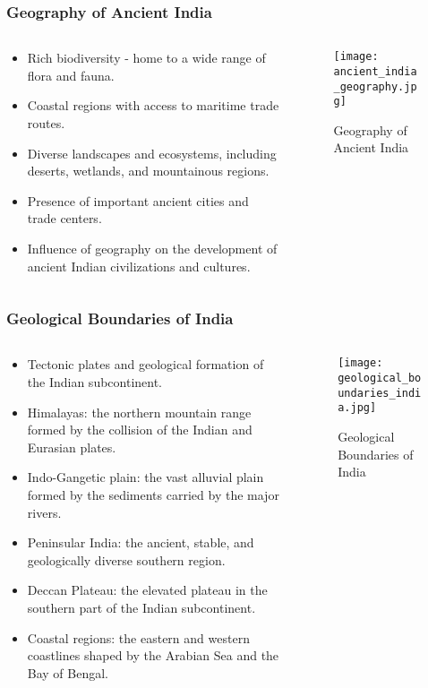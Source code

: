 \begin{frame}[fragile]\frametitle{Geography of Ancient India}
\begin{columns}
\begin{column}{0.5\textwidth}
\begin{itemize}
   \item Rich biodiversity - home to a wide range of flora and fauna.
   \item Coastal regions with access to maritime trade routes.
   \item Diverse landscapes and ecosystems, including deserts, wetlands, and mountainous regions.
   \item Presence of important ancient cities and trade centers.
   \item Influence of geography on the development of ancient Indian civilizations and cultures.
\end{itemize}
\end{column}
\begin{column}{0.5\textwidth}
\begin{figure}
   \texttt{[image: ancient\_india\_geography.jpg]}
   \caption{Geography of Ancient India}
\end{figure}
\end{column}
\end{columns}
\end{frame}

\begin{frame}[fragile]\frametitle{Geological Boundaries of India}
\begin{columns}
\begin{column}{0.5\textwidth}
\begin{itemize}
   \item Tectonic plates and geological formation of the Indian subcontinent.
   \item Himalayas: the northern mountain range formed by the collision of the Indian and Eurasian plates.
   \item Indo-Gangetic plain: the vast alluvial plain formed by the sediments carried by the major rivers.
   \item Peninsular India: the ancient, stable, and geologically diverse southern region.
   \item Deccan Plateau: the elevated plateau in the southern part of the Indian subcontinent.
   \item Coastal regions: the eastern and western coastlines shaped by the Arabian Sea and the Bay of Bengal.
\end{itemize}
\end{column}
\begin{column}{0.5\textwidth}
\begin{figure}
   \texttt{[image: geological\_boundaries\_india.jpg]}
   \caption{Geological Boundaries of India}
\end{figure}
\end{column}
\end{columns}
\end{frame}


